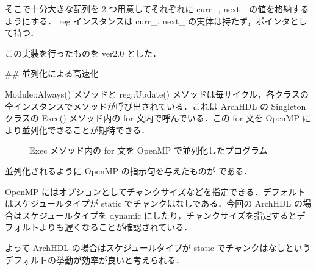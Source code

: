 そこで十分大きな配列を 2 つ用意してそれぞれに curr_, next_ の値を格納するようにする．
reg インスタンスは curr_, next_ の実体は持たず，ポインタとして持つ．

この実装を行ったものを ver2.0 とした．




## 並列化による高速化 \label{ss:parallel}

Module::Always() メソッドと
reg::Update() メソッドは毎サイクル，各クラスの全インスタンスでメソッドが呼び出されている．これは
ArchHDL の Singleton クラスの Exec() メソッド内の
for 文内で呼んでいる．この
for 文を OpenMP により並列化できることが期待できる．

\begin{figure}[t]
 
 \caption{Exec メソッド内の for 文を OpenMP で並列化したプログラム}
 \label{src:exec_openmp}
\end{figure}

並列化されるように OpenMP の指示句を与えたものが  である．

OpenMP にはオプションとしてチャンクサイズなどを指定できる．デフォルトはスケジュールタイプが
static でチャンクはなしである．今回の ArchHDL の場合はスケジュールタイプを dynamic
にしたり，チャンクサイズを指定するとデフォルトよりも遅くなることが確認されている．

よって ArchHDL の場合はスケジュールタイプが static でチャンクはなしというデフォルトの挙動が効率が良いと考えられる．

